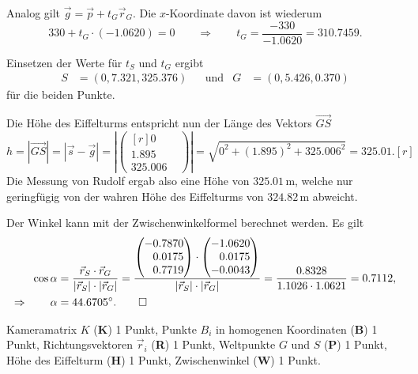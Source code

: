 \begin{loesung}
\begin{teilaufgaben}
Analog gilt $\vec g = \vec {p} + t_G\vec{r}_G$.
Die $x$-Koordinate davon ist wiederum
\[
330 + t_G\cdot (-1.0620) = 0
\qquad\Rightarrow\qquad
t_G = \frac{-330}{-1.0620}=310.7459.
\]

Einsetzen der Werte für $t_S$ und $t_G$ ergibt
\[
\begin{aligned}
S&=(0, 7.321, 325.376)
&&\text{und}&
G&=(0, 5.426, 0.370)
\end{aligned}
\]
für die beiden Punkte. 

Die Höhe des Eiffelturms entspricht nun der Länge des Vektors $\overrightarrow{GS}$
\[
  h = |\overrightarrow{GS}| = |\vec s - \vec g| = 
\left|\begin{pmatrix*}[r]
0\phantom{.000}\\
1.895\\
325.006
\end{pmatrix*}\right| = \sqrt{0^2 + (1.895)^2 + 325.006^2} = 325.01.[r]
\]
Die Messung von Rudolf ergab also eine Höhe von $325.01\,$m, welche nur geringfügig 
von der wahren Höhe des Eiffelturms von $324.82\,$m abweicht.
\item
Der Winkel kann mit der Zwischenwinkelformel berechnet werden.
Es gilt
\begin{align*}
\cos\alpha
&=
\frac{\vec r_S\cdot\vec r_G}{|\vec r_S|\cdot|\vec r_G|}
=
\frac{\begin{pmatrix}
-0.7870 \\
\phantom{-}0.0175 \\
\phantom{-}0.7719
\end{pmatrix}
\cdot\begin{pmatrix}
-1.0620 \\
\phantom{-}0.0175 \\
-0.0043
\end{pmatrix}}
{|\vec r_S|\cdot|\vec r_G|}
=
\frac{0.8328}{1.1026\cdot 1.0621} = 0.7112,
\\
\Rightarrow\qquad
\alpha
&=
44.6705^\circ.
\qedhere
\end{align*}
\end{teilaufgaben}
\end{loesung}

\begin{bewertung}
Kameramatrix $K$ ({\bf K}) 1 Punkt,
Punkte $B_i$ in homogenen Koordinaten ({\bf B}) 1 Punkt,
Richtungsvektoren $\vec{r}_i$ ({\bf R}) 1 Punkt,
Weltpunkte $G$ und $S$ ({\bf P}) 1 Punkt,
Höhe des Eiffelturm ({\bf H}) 1 Punkt,
Zwischenwinkel ({\bf W}) 1 Punkt.
\end{bewertung}
